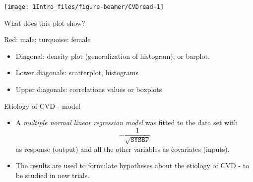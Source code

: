 \documentclass[ignorenonframetext,]{beamer}
\providecommand{\tightlist}{%
  \setlength{\itemsep}{0pt}\setlength{\parskip}{0pt}}
\begin{document}
\begin{frame}

\begin{center}\texttt{[image: 1Intro\_files/figure-beamer/CVDread-1]} \end{center}

What does this plot show?

Red: male; turquoise: female

\end{frame}

\begin{frame}

\begin{itemize}
\tightlist
\item
  Diagonal: density plot (generalization of histogram), or barplot.
\item
  Lower diagonals: scatterplot, histograms
\item
  Upper diagonals: correlations values or boxplots
\end{itemize}

\end{frame}

\begin{frame}

\begin{block}{Etiology of CVD - model}

\begin{itemize}
\item
  A \emph{multiple normal linear regression model} was fitted to the
  data set with \[-\frac{1}{\sqrt{\texttt{SYSBP}}}\] as response
  (output) and all the other variables as covariates (inputs).
\item
  The results are used to formulate hypotheses about the etiology of CVD
  - to be studied in new trials.
\end{itemize}

\end{block}

\end{frame}
\end{document}
